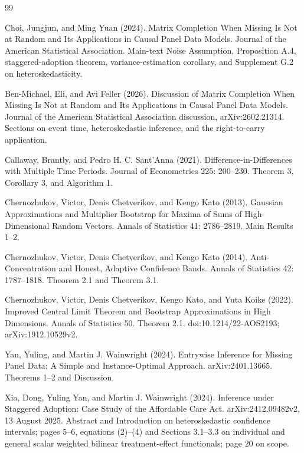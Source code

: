 \documentclass{article}
\begin{document}
\begin{thebibliography}{99}

   Choi, Jungjun, and Ming Yuan (2024). Matrix Completion When Missing Is Not at Random and Its Applications in Causal Panel Data Models. Journal of the American Statistical Association. Main-text Noise Assumption, Proposition A.4, staggered-adoption theorem, variance-estimation corollary, and Supplement G.2 on heteroskedasticity.

   Ben-Michael, Eli, and Avi Feller (2026). Discussion of Matrix Completion When Missing Is Not at Random and Its Applications in Causal Panel Data Models. Journal of the American Statistical Association discussion, arXiv:2602.21314. Sections on event time, heteroskedastic inference, and the right-to-carry application.

   Callaway, Brantly, and Pedro H. C. Sant'Anna (2021). Difference-in-Differences with Multiple Time Periods. Journal of Econometrics 225: 200--230. Theorem 3, Corollary 3, and Algorithm 1.

   Chernozhukov, Victor, Denis Chetverikov, and Kengo Kato (2013). Gaussian Approximations and Multiplier Bootstrap for Maxima of Sums of High-Dimensional Random Vectors. Annals of Statistics 41: 2786--2819. Main Results 1--2.

   Chernozhukov, Victor, Denis Chetverikov, and Kengo Kato (2014). Anti-Concentration and Honest, Adaptive Confidence Bands. Annals of Statistics 42: 1787--1818. Theorem 2.1 and Theorem 3.1.

   Chernozhukov, Victor, Denis Chetverikov, Kengo Kato, and Yuta Koike (2022). Improved Central Limit Theorem and Bootstrap Approximations in High Dimensions. Annals of Statistics 50. Theorem 2.1. doi:10.1214/22-AOS2193; arXiv:1912.10529v2.

   Yan, Yuling, and Martin J. Wainwright (2024). Entrywise Inference for Missing Panel Data: A Simple and Instance-Optimal Approach. arXiv:2401.13665. Theorems 1--2 and Discussion.

   Xia, Dong, Yuling Yan, and Martin J. Wainwright (2024). Inference under Staggered Adoption: Case Study of the Affordable Care Act. arXiv:2412.09482v2, 13 August 2025. Abstract and Introduction on heteroskedastic confidence intervals; pages 5--6, equations (2)--(4) and Sections 3.1--3.3 on individual and general scalar weighted bilinear treatment-effect functionals; page 20 on scope.


\end{thebibliography}
\end{document}
